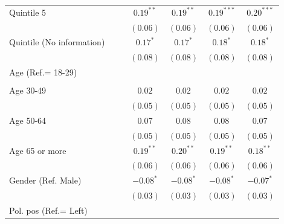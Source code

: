 \documentclass[
  12pt,
  a4paper,
]{article}
\begin{document}
\begin{table}[!ht]
\begin{center}
{\begin{tabular}{l c c c c c c}
\quad Quintile 5                    &               &               & $0.19^{**}$   & $0.19^{**}$   & $0.19^{***}$  & $0.20^{***}$  \\
                                    &               &               & $(0.06)$      & $(0.06)$      & $(0.06)$      & $(0.06)$      \\
\quad Quintile (No information)     &               &               & $0.17^{*}$    & $0.17^{*}$    & $0.18^{*}$    & $0.18^{*}$    \\
                                    &               &               & $(0.08)$      & $(0.08)$      & $(0.08)$      & $(0.08)$      \\
Age (Ref.= 18-29)                   &               &               &               &               &               &               \\
                                    &               &               &               &               &               &               \\
\quad Age 30-49                     &               &               & $0.02$        & $0.02$        & $0.02$        & $0.02$        \\
                                    &               &               & $(0.05)$      & $(0.05)$      & $(0.05)$      & $(0.05)$      \\
\quad Age 50-64                     &               &               & $0.07$        & $0.08$        & $0.08$        & $0.07$        \\
                                    &               &               & $(0.05)$      & $(0.05)$      & $(0.05)$      & $(0.05)$      \\
\quad Age 65 or more                &               &               & $0.19^{**}$   & $0.20^{**}$   & $0.19^{**}$   & $0.18^{**}$   \\
                                    &               &               & $(0.06)$      & $(0.06)$      & $(0.06)$      & $(0.06)$      \\
Gender (Ref. Male)                  &               &               & $-0.08^{*}$   & $-0.08^{*}$   & $-0.08^{*}$   & $-0.07^{*}$   \\
                                    &               &               & $(0.03)$      & $(0.03)$      & $(0.03)$      & $(0.03)$      \\
Pol. pos (Ref.= Left)               &               &               &               &               &               &               \\

\end{tabular}}
\end{center}
\end{table}
\end{document}

